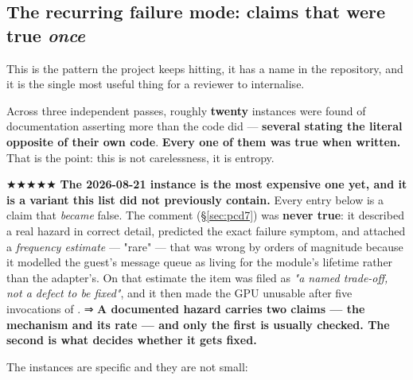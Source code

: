 \documentclass[10.5pt]{article}
\begin{document}
\subsection{\texorpdfstring{The recurring failure mode: claims that were true \emph{once}}{The recurring failure mode: claims that were true once}}
\label{sec:drift}

This is the pattern the project keeps hitting, it has a name in the repository, and it is the
single most useful thing for a reviewer to internalise.

\begin{claimbox}\small
Across three independent passes, roughly \textbf{twenty} instances were found of documentation
asserting more than the code did — \textbf{several stating the literal opposite of their own
code}. \textbf{Every one of them was true when written.} That is the point: this is not
carelessness, it is entropy.
\hfill {}
\end{claimbox}

★★★★★ \textbf{The 2026-08-21 instance is the most expensive one yet, and it is a variant this
list did not previously contain.} Every entry below is a claim that \emph{became} false. The
 comment (\S\ref{sec:pcd7}) was \textbf{never true}: it described a real hazard in
correct detail, predicted the exact failure symptom, and attached a \emph{frequency estimate} ---
"rare" --- that was wrong by orders of magnitude because it modelled the guest's message queue as
living for the module's lifetime rather than the adapter's. On that estimate the item was filed
as \emph{"a named trade-off, not a defect to be fixed"}, and it then made the GPU unusable after
five invocations of . ⇒ \textbf{A documented hazard carries two claims --- the
mechanism and its rate --- and only the first is usually checked. The second is what decides
whether it gets fixed.}

\smallskip
The instances are specific and they are not small:
\end{document}
